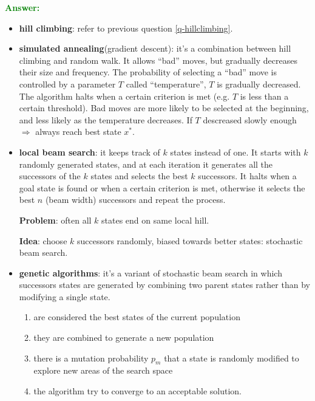 \documentclass[12pt]{article}
\begin{document}
\begin{enumerate}[label=\textbf{II.\arabic*}]
    \textcolor{green}{\textbf{Answer:}}
    \begin{itemize}
        \item \textbf{hill climbing}: refer to previous question \ref{q-hillclimbing}.
        \item \textbf{simulated annealing}(gradient descent): it's a combination between hill climbing and random walk. 
        It allows ``bad'' moves, but gradually decreases their size and frequency.
        The probability of selecting a ``bad'' move is controlled by a parameter $T$ called ``temperature'', $T$ is gradually decreased.
        The algorithm halts when a certain criterion is met (e.g. $T$ is less than a certain threshold).
        Bad moves are more likely to be selected at the beginning, and less likely as the temperature decreases.
        If $T$ descreased slowly enough $\Rightarrow$ always reach best state $x^*$.
        \item \textbf{local beam search}: it keeps track of $k$ states instead of one.
        It starts with $k$ randomly generated states, and at each iteration it generates all the successors of the $k$ states and selects the best $k$ successors.
        It halts when a goal state is found or when a certain criterion is met, otherwise it selects the best $n$ (beam width) successors and repeat the process.

        \textbf{Problem}: often all $k$ states end on same local hill.

        \textbf{Idea}: choose $k$ successors randomly, biased towards better states: stochastic beam search.
        
        \item \textbf{genetic algorithms}: it's a variant of stochastic beam search in which successors
        states are generated by combining two parent states rather than by modifying a single state.
        \begin{enumerate}
            \item are considered the best states of the current population
            \item they are combined to generate a new population
            \item there is a mutation probability $p_m$ that a state is randomly modified to explore new areas of the search space
            \item the algorithm try to converge to an acceptable solution.
        \end{enumerate}


    \end{itemize}
\end{enumerate}
\end{document}
